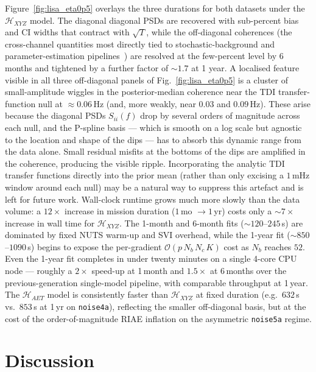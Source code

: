 \documentclass[%
	reprint,
	nofootinbib,
	amsmath,
	amssymb,
	aps,
]{revtex4-2}
\begin{document}
	Figure~\ref{fig:lisa_eta0p5} overlays the three durations for both
	datasets under the $\mathcal{H}_{XYZ}$ model. The diagonal
	diagonal PSDs are recovered with sub-percent bias and CI widths that
	contract with $\sqrt{T}$, while the off-diagonal coherences (the
	cross-channel quantities most directly tied to
	stochastic-background and parameter-estimation
	pipelines~\citep{katz2024globalfit}) are resolved at the
	few-percent level by 6 months and tightened by a further factor of
	$\sim 1.7$ at 1 year. A localised feature visible in all three
	off-diagonal panels of Fig.~\ref{fig:lisa_eta0p5} is a cluster of
	small-amplitude wiggles in the posterior-median coherence near the
	TDI transfer-function null at $\approx 0.06$\,Hz (and, more weakly,
	near $0.03$ and $0.09$\,Hz). These arise because the diagonal PSDs
	$S_{ii}(f)$ drop by several orders of magnitude across each null,
	and the P-spline basis --- which is smooth on a log scale but
	agnostic to the location and shape of the dips --- has to absorb
	this dynamic range from the data alone. Small residual misfits at
	the bottoms of the dips are amplified in the coherence, producing
	the visible ripple. Incorporating the analytic TDI transfer
	functions directly into the prior mean (rather than only excising
	a $1$\,mHz window around each null) may be a natural way to
	suppress this artefact and is left for future work.
	Wall-clock runtime grows much more slowly
	than the data volume: a $12\times$ increase in mission duration
	($1$\,mo $\to 1$\,yr) costs only a $\sim\!7\times$ increase in
	wall time for $\mathcal{H}_{XYZ}$. The 1-month and 6-month fits
	($\sim\!120$--$245$\,s) are dominated by fixed NUTS warm-up and
	SVI overhead, while the 1-year fit ($\sim\!850$--$1090$\,s) begins
	to expose the per-gradient $\mathcal{O}(p\,N_{b}\,N_{c}\,K)$ cost
	as $N_{b}$ reaches $52$. Even the 1-year fit completes in under
	twenty minutes on a single 4-core CPU node --- roughly a
	$2\times$ speed-up at 1\,month and $1.5\times$ at 6\,months over
	the previous-generation single-model pipeline, with comparable
	throughput at 1\,year. The $\mathcal{H}_{AET}$ model is
	consistently faster than $\mathcal{H}_{XYZ}$ at fixed duration
	(e.g.\ $632$\,s vs.\ $853$\,s at 1\,yr on \texttt{noise4a}),
	reflecting the smaller off-diagonal basis, but at the cost of the
	order-of-magnitude RIAE inflation on the asymmetric
	\texttt{noise5a} regime.

	\section{Discussion}
	\label{sec:discussion}
\end{document}

